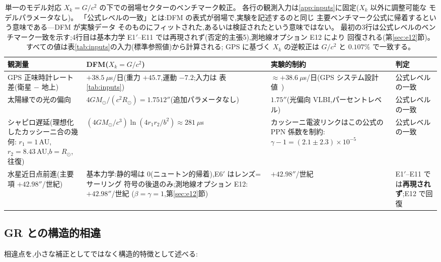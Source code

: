 \documentclass[a4paper,10pt,twocolumn]{ltjsarticle}
\newcommand{\Kt}{X_k}
\begin{document}
\begin{table}[t]
\caption{\label{tab:calib}%
単一のモデル対応 $\Kt = G/c^2$ の下での弱場セクターのベンチマーク較正。
各行の観測入力は\ref{app:inputs}に固定($\Kt$ 以外に調整可能な
モデルパラメータなし)。
「公式レベルの一致」とは:DFM の表式が弱場で,実験を記述するのと同じ
主要ベンチマーク公式に帰着するという意味である---DFM が実験データ
そのものにフィットされた,あるいは検証されたという意味ではない。
最初の3行は公式レベルのベンチマーク一致を示す;4行目は基本力学
E1$'$--E11 では再現されず(否定的主張5),測地線オプション E12 により
回復される(第\ref{sec:e12}節)。
すべての値は表\ref{tab:inputs}の入力(標準参照値)から計算される;
GPS に基づく $\Kt$ の逆較正は $G/c^2$ と $0.107\%$ で一致する。}
\centering
\small
\begin{tabular}{p{}p{}p{}p{}}
\toprule
観測量 & DFM($\Kt = G/c^2$) & 実験的制約 & 判定 \\
\midrule
GPS 正味時計レート差(衛星 $-$ 地上) &
$+38.5\ \mu$s/日(重力 $+45.7$,運動 $-7.2$;入力は
表\ref{tab:inputs}) &
$\approx +38.6\ \mu$s/日(GPS システム設計値~\cite{Ashby2003}) &
公式レベルの一致 \\
太陽縁での光の偏向 &
$4GM_\odot/(c^2R_\odot) = 1.7512''$(追加パラメータなし) &
$1.75''$(光偏向 VLBI,パーセントレベル) &
公式レベルの一致 \\
シャピロ遅延(理想化したカッシーニ合の幾何:
$r_1 = 1\,$AU,$r_2 = 8.43\,$AU,$b = R_\odot$,往復) &
$(4GM_\odot/c^3)\ln(4r_1r_2/b^2) \approx 281\ \mu$s &
カッシーニ電波リンクはこの公式の PPN 係数を制約:
$\gamma - 1 = (2.1 \pm 2.3)\times10^{-5}$~\cite{Bertotti2003} &
公式レベルの一致 \\
水星近日点前進(主要項 $+42.98''$/世紀) &
基本力学:静的場は $0$(ニュートン的帰着),E6$'$ はレンズ=サーリング
符号の後退のみ;測地線オプション E12:$+42.98''$/世紀
($\beta = \gamma = 1$,第\ref{sec:e12}節) &
$+42.98''$/世紀 &
E1$'$--E11 では\textbf{再現されず};E12 で回復 \\
\bottomrule
\end{tabular}
\end{table}

\subsection{GR との構造的相違}
\label{sec:diff}

相違点を,小さな補正としてではなく構造的特徴として述べる:
\end{document}
